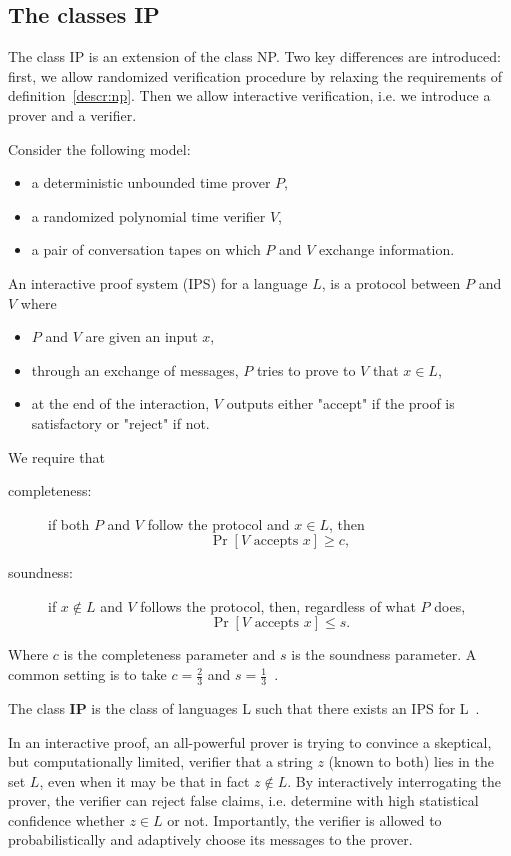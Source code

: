 \subsection{The classes IP}
The class IP is an extension of the class NP. Two key differences are introduced: first, we allow randomized verification procedure by relaxing the requirements of definition~\ref{descr:np}. Then we allow interactive verification, i.e. we introduce a prover and a verifier.
\begin{defn}
    Consider the following model:
    \begin{itemize}
        \item a deterministic unbounded time prover $P$,
        \item a randomized polynomial time verifier $V$,
        \item a pair of conversation tapes on which $P$ and $V$ exchange information.
    \end{itemize}
    An interactive proof system (IPS) for a language $L$, is a protocol between $P$ and $V$ where
    \begin{itemize}
        \item $P$ and $V$ are given an input $x$,
        \item through an exchange of messages, $P$ tries to prove to $V$ that $x \in L$,
        \item at the end of the interaction, $V$ outputs either "accept" if the proof is satisfactory or "reject" if not.
    \end{itemize}
    We require that
    \begin{description}
\item[completeness:] if both $P$ and $V$ follow the protocol and $x \in L$, then
$$
\operatorname{Pr}[V \text { accepts } x] \geq c,
$$
\item[soundness:] if $x \notin L$ and $V$ follows the protocol, then, regardless of what $P$ does,
$$
\operatorname{Pr}[V \text { accepts } x] \leq s.
$$
    \end{description}
    Where $c$ is the completeness parameter and $s$ is the soundness parameter. A common setting is to take $c=\frac{2}{3}$ and $s=\frac{1}{3}$~\cite{randomness}.
\end{defn}

\begin{defn}
    The class \textbf{IP} is the class of languages L such that there exists an IPS for L~\cite{randomness}.
\end{defn}
In an interactive proof, an all-powerful prover is trying to convince a skeptical, but computationally limited, verifier that a string $z$ (known to both) lies in the set $L$, even when it may be that in fact $z \notin L$. By interactively interrogating the prover, the verifier can reject false claims, i.e. determine with high statistical confidence whether $z \in L$ or not. Importantly, the verifier is allowed to probabilistically and adaptively choose its messages to the prover.


